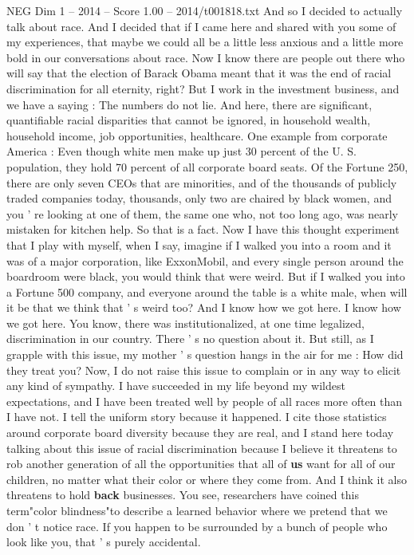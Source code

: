 \begin{textsample}{NEG Dim 1 – 2014 – Score 1.00 – 2014/t001818.txt}
And so I decided to actually talk about race.
And I decided that if I came here and shared with you some of my experiences, that maybe we could all be a little less anxious and a little more bold in our conversations about race.
Now I know there are people out there who will say that the election of Barack Obama meant that it was the end of racial discrimination for all eternity, right?
But I work in the investment business, and we have a saying : The numbers do not lie.
And here, there are significant, quantifiable racial disparities that cannot be ignored, in household wealth, household income, job opportunities, healthcare.
One example from corporate America : Even though white men make up just 30 percent of the U.
S. population, they hold 70 percent of all corporate board seats.
Of the Fortune 250, there are only seven CEOs that are minorities, and of the thousands of publicly traded companies today, thousands, only two are chaired by black women, and you ' re looking at one of them, the same one who, not too long ago, was nearly mistaken for kitchen help.
So that is a fact.
Now I have this thought experiment that I play with myself, when I say, imagine if I walked you into a room and it was of a major corporation, like ExxonMobil, and every single person around the boardroom were black, you would think that were weird.
But if I walked you into a Fortune 500 company, and everyone around the table is a white male, when will it be that we think that ' s weird too?
And I know how we got here.
I know how we got here.
You know, there was institutionalized, at one time legalized, discrimination in our country.
There ' s no question about it.
But still, as I grapple with this issue, my mother ' s question hangs in the air for me : How did they treat you?
Now, I do not raise this issue to complain or in any way to elicit any kind of sympathy.
I have succeeded in my life beyond my wildest expectations, and I have been treated well by people of all races more often than I have not.
I tell the uniform story because it happened.
I cite those statistics around corporate board diversity because they are real, and I stand here today talking about this issue of racial discrimination because I believe it threatens to rob another generation of all the opportunities that all of \textbf{us} want for all of our children, no matter what their color or where they come from.
And I think it also threatens to hold \textbf{back} businesses.
You see, researchers have coined this term"color blindness"to describe a learned behavior where we pretend that we don ' t notice race.
If you happen to be surrounded by a bunch of people who look like you, that ' s purely accidental.

\end{textsample}
